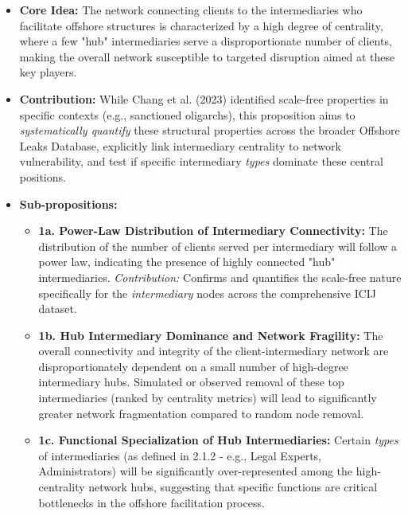 \begin{itemize}[leftmargin=*]
    \item \textbf{Core Idea:} The network connecting clients to the intermediaries who facilitate offshore structures is characterized by a high degree of centrality, where a few "hub" intermediaries serve a disproportionate number of clients, making the overall network susceptible to targeted disruption aimed at these key players.
    \item \textbf{Contribution:} While Chang et al. (2023) identified scale-free properties in specific contexts (e.g., sanctioned oligarchs), this proposition aims to \textit{systematically quantify} these structural properties across the broader Offshore Leaks Database, explicitly link intermediary centrality to network vulnerability, and test if specific intermediary \textit{types} dominate these central positions.
    \item \textbf{Sub-propositions:}
    \begin{itemize}[leftmargin=\parindent]
        \item \textbf{1a. Power-Law Distribution of Intermediary Connectivity:} The distribution of the number of clients served per intermediary will follow a power law, indicating the presence of highly connected "hub" intermediaries. \textit{Contribution:} Confirms and quantifies the scale-free nature specifically for the \textit{intermediary} nodes across the comprehensive ICIJ dataset.
        \item \textbf{1b. Hub Intermediary Dominance and Network Fragility:} The overall connectivity and integrity of the client-intermediary network are disproportionately dependent on a small number of high-degree intermediary hubs. Simulated or observed removal of these top intermediaries (ranked by centrality metrics) will lead to significantly greater network fragmentation compared to random node removal. 
        \item \textbf{1c. Functional Specialization of Hub Intermediaries:} Certain \textit{types} of intermediaries (as defined in 2.1.2 - e.g., Legal Experts, Administrators) will be significantly over-represented among the high-centrality network hubs, suggesting that specific functions are critical bottlenecks in the offshore facilitation process. 
    \end{itemize}
\end{itemize}

